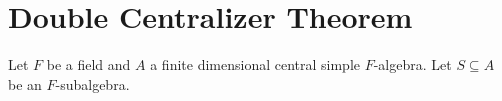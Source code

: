 \section{Double Centralizer Theorem}\label{sec:double-centralizer}

Let $F$ be a field and $A$ a finite dimensional central simple $F$-algebra. Let $S\subseteq A$ be an $F$-subalgebra.

